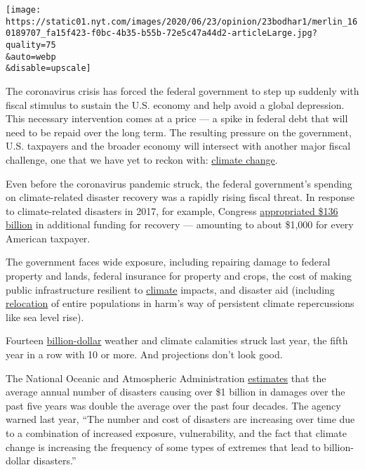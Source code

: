 \texttt{[image: https://static01.nyt.com/images/2020/06/23/opinion/23bodhar1/merlin\_160189707\_fa15f423-f0bc-4b35-b55b-72e5c47a44d2-articleLarge.jpg?quality=75\\\&auto=webp\\\&disable=upscale]}

The coronavirus crisis has forced the federal government to step up
suddenly with fiscal stimulus to sustain the U.S. economy and help avoid
a global depression. This necessary intervention comes at a price --- a
spike in federal debt that will need to be repaid over the long term.
The resulting pressure on the government, U.S. taxpayers and the broader
economy will intersect with another major fiscal challenge, one that we
have yet to reckon with:
\href{https://www.nytimes.com/2020/07/14/us/politics/biden-climate-plan.html}{climate
change}.

Even before the coronavirus pandemic struck, the federal government's
spending on climate-related disaster recovery was a rapidly rising
fiscal threat. In response to climate-related disasters in 2017, for
example, Congress
\href{https://fas.org/sgp/crs/homesec/R45084.pdf}{appropriated \$136
billion} in additional funding for recovery --- amounting to about
\$1,000 for every American taxpayer.

The government faces wide exposure, including repairing damage to
federal property and lands, federal insurance for property and crops,
the cost of making public infrastructure resilient to
\href{https://www.nytimes.com/2020/07/14/us/politics/biden-climate-plan.html}{climate}
impacts, and disaster aid (including
\href{https://www.npr.org/2017/01/10/509176361/alaskan-village-citing-climate-change-seeks-disaster-relief-in-order-to-relocate\#:~:text=Alaska\%20Climate\%20Change\%3A\%20Village\%20Makes\%20Historic\%20Request\%20To\%20Be\%20Declared,needs\%20to\%20move\%20the\%20community.}{relocation}
of entire populations in harm's way of persistent climate repercussions
like sea level rise).

Fourteen
\href{https://www.climate.gov/news-features/blogs/beyond-data/2010-2019-landmark-decade-us-billion-dollar-weather-and-climate}{billion-dollar}
weather and climate calamities struck last year, the fifth year in a row
with 10 or more. And projections don't look good.

The National Oceanic and Atmospheric Administration
\href{https://www.ncdc.noaa.gov/billions/}{estimates} that the average
annual number of disasters causing over \$1 billion in damages over the
past five years was double the average over the past four decades. The
agency warned last year, ``The number and cost of disasters are
increasing over time due to a combination of increased exposure,
vulnerability, and the fact that climate change is increasing the
frequency of some types of extremes that lead to billion-dollar
disasters.''

